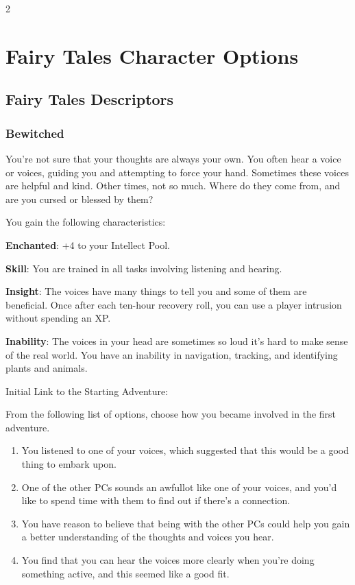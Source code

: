 \begin{multicols}{2}

\chapter{Fairy Tales Character Options}

\section{Fairy Tales Descriptors}

\subsection{Bewitched}

You’re not sure that your thoughts are always your own. You often hear a voice or voices, guiding you and attempting to force your hand. Sometimes these voices are helpful and kind. Other times, not so much. Where do they come from, and are you cursed or blessed by them?

You gain the following characteristics:

\textbf{Enchanted}: +4 to your Intellect Pool.

\textbf{Skill}: You are trained in all tasks involving listening and hearing.

\textbf{Insight}: The voices have many things to tell you and some of them are beneficial. Once after each ten-hour recovery roll, you can use a player intrusion without spending an XP.

\textbf{Inability}: The voices in your head are sometimes so loud it’s hard to make sense of the real world. You have an inability in navigation, tracking, and identifying plants and animals.

Initial Link to the Starting Adventure:

From the following list of options, choose how you became involved in the first adventure.
\begin{enumerate}
\item You listened to one of your voices, which suggested that this would be a good thing to embark upon.
\item One of the other PCs sounds an awfullot like one of your voices, and you’d like to spend time with them to find out if there’s a connection.
\item You have reason to believe that being with the other PCs could help you gain a better understanding of the thoughts and voices you hear.
\item You find that you can hear the voices more clearly when you’re doing something active, and this seemed like a good fit.
\end{enumerate}


\end{multicols}
